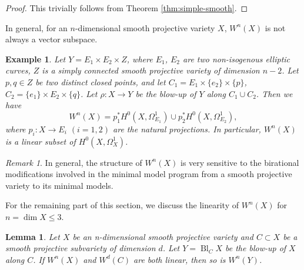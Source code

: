 \documentclass[a4paper,12pt,reqno]{amsart}
\newtheorem{lemma}[theorem]{Lemma}
\newtheorem{example}[theorem]{Example}
\theoremstyle{question}
\theoremstyle{definition}
\theoremstyle{remark}
\newtheorem{remark}[theorem]{Remark}
\theoremstyle{cited}
\theoremstyle{citeddef}
\DeclareMathOperator{\Bl}{Bl}
\begin{document}
\begin{proof}
This trivially follows from Theorem \ref{thm:simple-smooth}.
\end{proof}

In general, for an $n$-dimensional smooth projective variety $X$, $W^n(X)$ is not always a vector subspace.
\begin{example}
    Let $Y=E_{1}\times E_{2}\times Z$, where $E_{1}$, $E_{2}$ are two non-isogenous elliptic curves, $Z$ is a simply connected smooth projective variety of dimension $n-2$. Let $p,q\in Z$ be two distinct closed points, and let $C_{1}=E_{1}\times\{e_{2}\}\times\{p\}$, $C_{2}=\{e_{1}\}\times E_{2}\times\{q\}$. Let $\rho:X\to Y$ be the blow-up of $Y$ along $C_{1}\cup C_{2}$. Then we have
    $$W^{n}(X)=p_{1}^{*}H^{0}(X,\Omega_{E_{1}}^{1})\cup p_{2}^{*}H^{0}(X,\Omega_{E_{2}}^{1}),$$
    where $p_{i}\colon X\to E_{i}$ $(i=1,2)$ are the natural projections. In particular, $W^{n}(X)$ is a linear subset of $H^{0}(X,\Omega_{X}^{1})$. 
\end{example}

 

\begin{remark}
In general, the structure of $W^n(X)$ is very sensitive to the birational modifications involved in the minimal model program from a smooth projective variety to its minimal models. 
\end{remark}

For the remaining part of this section, we discuss the linearity of $W^n(X)$ for $n=\dim X\leq 3$.

\begin{lemma}\label{lem:linearity-blowup}
    Let $X$ be an n-dimensional smooth projective variety and $C\subset X$ be a smooth projective subvariety of dimension $d$. Let $Y=\Bl_{C}X$ be the blow-up of $X$ along $C$. If $W^n(X)$ and $W^d(C)$ are both linear, then so is $W^n(Y)$.
\end{lemma}
\end{document}
